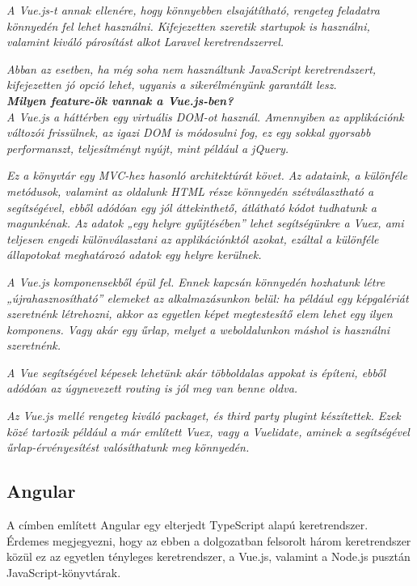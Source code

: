 \textit{A Vue.js-t annak ellenére, hogy könnyebben elsajátítható, rengeteg feladatra könnyedén fel lehet használni. Kifejezetten szeretik startupok is használni, valamint kiváló párosítást alkot Laravel keretrendszerrel.}

\textit{Abban az esetben, ha még soha nem használtunk JavaScript keretrendszert, kifejezetten jó opció lehet, ugyanis a sikerélményünk garantált lesz.}\\

\noindent\textit{\textbf{Milyen feature-ök vannak a Vue.js-ben?}}\\

\textit{A Vue.js a háttérben egy virtuális DOM-ot használ. Amennyiben az applikációnk változói frissülnek, az igazi DOM is módosulni fog, ez egy sokkal gyorsabb performanszt, teljesítményt nyújt, mint például a jQuery.}

\textit{Ez a könyvtár egy MVC-hez hasonló architektúrát követ. Az adataink, a különféle metódusok, valamint az oldalunk HTML része könnyedén szétválasztható a segítségével, ebből adódóan egy jól áttekinthető, átlátható kódot tudhatunk a magunkénak. Az adatok „egy helyre gyűjtésében” lehet segítségünkre a Vuex, ami teljesen engedi különválasztani az applikációnktól azokat, ezáltal a különféle állapotokat meghatározó adatok egy helyre kerülnek.}

\textit{A Vue.js komponensekből épül fel. Ennek kapcsán könnyedén hozhatunk létre „újrahasznosítható” elemeket az alkalmazásunkon belül: ha például egy képgalériát szeretnénk létrehozni, akkor az egyetlen képet megtestesítő elem lehet egy ilyen komponens. Vagy akár egy űrlap, melyet a weboldalunkon máshol is használni szeretnénk.}

\textit{A Vue segítségével képesek lehetünk akár többoldalas appokat is építeni, ebből adódóan az úgynevezett routing is jól meg van benne oldva.}

\textit{Az Vue.js mellé rengeteg kiváló packaget, és third party plugint készítettek. Ezek közé tartozik például a már említett Vuex, vagy a Vuelidate, aminek a segítségével űrlap-érvényesítést valósíthatunk meg könnyedén.}


\subsection{Angular}

A címben említett Angular egy elterjedt TypeScript alapú keretrendszer. Érdemes megjegyezni, hogy az ebben a dolgozatban felsorolt három keretrendszer közül ez az egyetlen tényleges keretrendszer, a Vue.js, valamint a Node.js pusztán JavaScript-könyvtárak.


